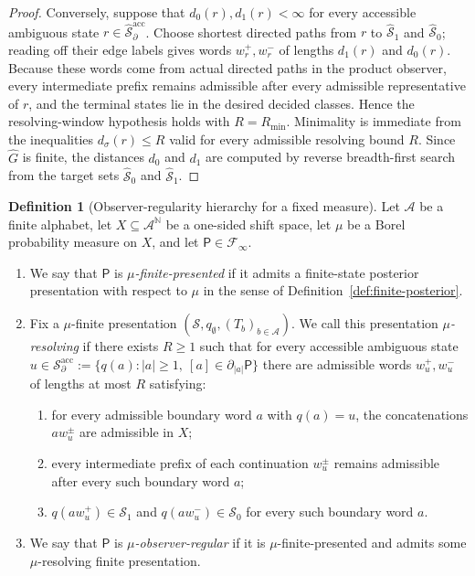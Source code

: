 \documentclass{etds}%
\numberwithin{equation}{section}
\theoremstyle{plain}
\theoremstyle{definition}
\newtheorem{definition}[theorem]{Definition}
\theoremstyle{remark}
\newcommand{\NN}{\mathbb{N}}
\begin{document}
\begin{proof}
Conversely, suppose that $d_0(r),d_1(r)<\infty$ for every accessible
ambiguous state $r\in\widehat{\mathcal{S}}_\partial^{\mathrm{acc}}$.
Choose shortest directed paths from $r$ to
$\widehat{\mathcal{S}}_1$ and $\widehat{\mathcal{S}}_0$; reading off their edge
labels gives words $w_r^+,w_r^-$ of lengths
$d_1(r)$ and $d_0(r)$.  Because these words come from actual directed paths in
the product observer, every intermediate prefix remains admissible after every
admissible representative of $r$, and the terminal states lie in the desired
decided classes.  Hence the resolving-window hypothesis holds with
$R=R_{\min}$.  Minimality is immediate from the inequalities
$d_\sigma(r)\le R$ valid for every admissible resolving bound $R$.  Since
$\widehat G$ is finite, the distances $d_0$ and $d_1$ are computed by reverse
breadth-first search from the target sets
$\widehat{\mathcal{S}}_0$ and $\widehat{\mathcal{S}}_1$.
\end{proof}

\begin{definition}[Observer-regularity hierarchy for a fixed measure]
\label{def:observer-regular}
Let $\mathcal{A}$ be a finite alphabet, let $X\subseteq\mathcal{A}^{\NN}$ be a
one-sided shift space, let $\mu$ be a Borel probability measure on $X$, and
let $\mathsf{P}\in\mathcal{F}_\infty$.
\begin{enumerate}[label=(\roman*)]
\item We say that $\mathsf{P}$ is \emph{$\mu$-finite-presented} if it admits a
  finite-state posterior presentation with respect to $\mu$ in the sense of
  Definition~\ref{def:finite-posterior}.
\item Fix a $\mu$-finite presentation
  $(\mathcal{S},q_\emptyset,(T_b)_{b\in\mathcal{A}})$.  We call this
  presentation \emph{$\mu$-resolving} if there exists $R\ge 1$ such that for
  every accessible ambiguous state
  $u\in\mathcal{S}_\partial^{\mathrm{acc}}
  :=\{q(a): |a|\ge 1,\ [a]\in\partial_{|a|}\mathsf{P}\}$ there are admissible
  words $w_u^+,w_u^-$ of lengths at most $R$ satisfying:
  \begin{enumerate}[label=(\alph*)]
  \item for every admissible boundary word $a$ with $q(a)=u$, the
    concatenations $aw_u^\pm$ are admissible in $X$;
  \item every intermediate prefix of each continuation $w_u^\pm$ remains
    admissible after every such boundary word $a$;
  \item $q(aw_u^+)\in\mathcal{S}_1$ and $q(aw_u^-)\in\mathcal{S}_0$ for every
    such boundary word $a$.
  \end{enumerate}
\item We say that $\mathsf{P}$ is \emph{$\mu$-observer-regular} if it is
  $\mu$-finite-presented and admits some $\mu$-resolving finite presentation.
\end{enumerate}
\end{definition}
\end{document}
